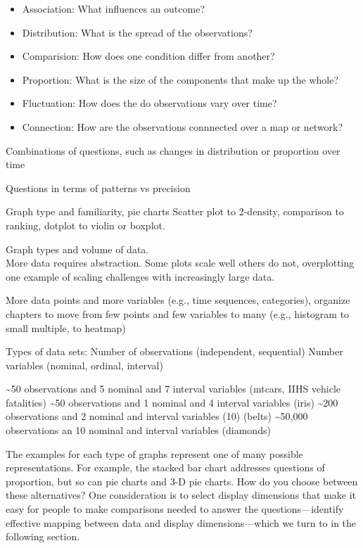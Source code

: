 \documentclass[]{krantz}
\providecommand{\tightlist}{%
  \setlength{\itemsep}{0pt}\setlength{\parskip}{0pt}}
\begin{document}
\begin{itemize}
\tightlist
\item
  Association: What influences an outcome?
\item
  Distribution: What is the spread of the observations?
\item
  Comparision: How does one condition differ from another?
\item
  Proportion: What is the size of the components that make up the whole?
\item
  Fluctuation: How does the do observations vary over time?
\item
  Connection: How are the observations connnected over a map or network?
\end{itemize}

Combinations of questions, such as changes in distribution or proportion over time

Questions in terms of patterns vs precision

Graph type and familiarity, pie charts
Scatter plot to 2-density, comparison to ranking, dotplot to violin or boxplot.

Graph types and volume of data.\\
More data requires abstraction. Some plots scale well others do not, overplotting one example of scaling challenges with increasingly large data.

More data points and more variables (e.g., time sequences, categories), organize chapters to move from few points and few variables to many (e.g., histogram to small multiple, to heatmap)

Types of data sets:
Number of observations (independent, sequential)
Number variables (nominal, ordinal, interval)

\textasciitilde{}50 observations and 5 nominal and 7 interval variables (mtcars, IIHS vehicle fatalities)
\textasciitilde{}50 observations and 1 nominal and 4 interval variables (iris)
\textasciitilde{}200 observations and 2 nominal and interval variables (10) (belts)
\textasciitilde{}50,000 observations an 10 nominal and interval variables (diamonds)

The examples for each type of graphs represent one of many possible representations. For example, the stacked bar chart addresses questions of proportion, but so can pie charts and 3-D pie charts. How do you choose between these alternatives? One consideration is to select display dimensions that make it easy for people to make comparisons needed to answer the questions---identify effective mapping between data and display dimensions---which we turn to in the following section.
\end{document}
